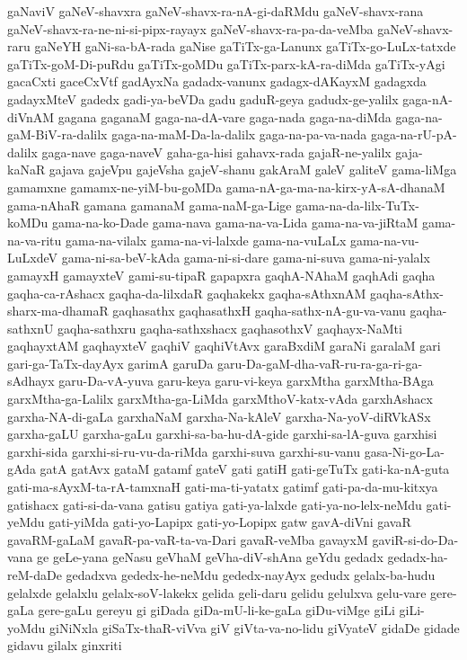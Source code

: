 {gaNaviV
gaNeV-shavxra
gaNeV-shavx-ra-nA-gi-daRMdu
gaNeV-shavx-rana
gaNeV-shavx-ra-ne-ni-si-pipx-rayayx
gaNeV-shavx-ra-pa-da-veMba
gaNeV-shavx-raru
gaNeYH
gaNi-sa-bA-rada
gaNise
gaTiTx-ga-Lanunx
gaTiTx-go-LuLx-tatxde
gaTiTx-goM-Di-puRdu
gaTiTx-goMDu
gaTiTx-parx-kA-ra-diMda
gaTiTx-yAgi
gacaCxti
gaceCxVtf
gadAyxNa
gadadx-vanunx
gadagx-dAKayxM
gadagxda
gadayxMteV
gadedx
gadi-ya-beVDa
gadu
gaduR-geya
gadudx-ge-yalilx
gaga-nA-diVnAM
gagana
gaganaM
gaga-na-dA-vare
gaga-nada
gaga-na-diMda
gaga-na-gaM-BiV-ra-dalilx
gaga-na-maM-Da-la-dalilx
gaga-na-pa-va-nada
gaga-na-rU-pA-dalilx
gaga-nave
gaga-naveV
gaha-ga-hisi
gahavx-rada
gajaR-ne-yalilx
gaja-kaNaR
gajava
gajeVpu
gajeVsha
gajeV-shanu
gakAraM
galeV
galiteV
gama-liMga
gamamxne
gamamx-ne-yiM-bu-goMDa
gama-nA-ga-ma-na-kirx-yA-sA-dhanaM
gama-nAhaR
gamana
gamanaM
gama-naM-ga-Lige
gama-na-da-lilx-TuTx-koMDu
gama-na-ko-Dade
gama-nava
gama-na-va-Lida
gama-na-va-jiRtaM
gama-na-va-ritu
gama-na-vilalx
gama-na-vi-lalxde
gama-na-vuLaLx
gama-na-vu-LuLxdeV
gama-ni-sa-beV-kAda
gama-ni-si-dare
gama-ni-suva
gama-ni-yalalx
gamayxH
gamayxteV
gami-su-tipaR
gapapxra
gaqhA-NAhaM
gaqhAdi
gaqha
gaqha-ca-rAshacx
gaqha-da-lilxdaR
gaqhakekx
gaqha-sAthxnAM
gaqha-sAthx-sharx-ma-dhamaR
gaqhasathx
gaqhasathxH
gaqha-sathx-nA-gu-va-vanu
gaqha-sathxnU
gaqha-sathxru
gaqha-sathxshacx
gaqhasothxV
gaqhayx-NaMti
gaqhayxtAM
gaqhayxteV
gaqhiV
gaqhiVtAvx
garaBxdiM
garaNi
garalaM
gari
gari-ga-TaTx-dayAyx
garimA
garuDa
garu-Da-gaM-dha-vaR-ru-ra-ga-ri-ga-sAdhayx
garu-Da-vA-yuva
garu-keya
garu-vi-keya
garxMtha
garxMtha-BAga
garxMtha-ga-Lalilx
garxMtha-ga-LiMda
garxMthoV-katx-vAda
garxhAshacx
garxha-NA-di-gaLa
garxhaNaM
garxha-Na-kAleV
garxha-Na-yoV-diRVkASx
garxha-gaLU
garxha-gaLu
garxhi-sa-ba-hu-dA-gide
garxhi-sa-lA-guva
garxhisi
garxhi-sida
garxhi-si-ru-vu-da-riMda
garxhi-suva
garxhi-su-vanu
gasa-Ni-go-La-gAda
gatA
gatAvx
gataM
gatamf
gateV
gati
gatiH
gati-geTuTx
gati-ka-nA-guta
gati-ma-sAyxM-ta-rA-tamxnaH
gati-ma-ti-yatatx
gatimf
gati-pa-da-mu-kitxya
gatishacx
gati-si-da-vana
gatisu
gatiya
gati-ya-lalxde
gati-ya-no-lelx-neMdu
gati-yeMdu
gati-yiMda
gati-yo-Lapipx
gati-yo-Lopipx
gatw
gavA-diVni
gavaR
gavaRM-gaLaM
gavaR-pa-vaR-ta-va-Dari
gavaR-veMba
gavayxM
gaviR-si-do-Da-vana
ge
geLe-yana
geNasu
geVhaM
geVha-diV-shAna
geYdu
gedadx
gedadx-ha-reM-daDe
gedadxva
gededx-he-neMdu
gededx-nayAyx
gedudx
gelalx-ba-hudu
gelalxde
gelalxlu
gelalx-soV-lakekx
gelida
geli-daru
gelidu
gelulxva
gelu-vare
gere-gaLa
gere-gaLu
gereyu
gi
giDada
giDa-mU-li-ke-gaLa
giDu-viMge
giLi
giLi-yoMdu
giNiNxla
giSaTx-thaR-viVva
giV
giVta-va-no-lidu
giVyateV
gidaDe
gidade
gidavu
gilalx
ginxriti
}
